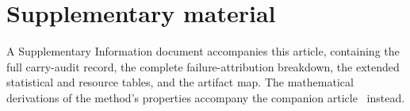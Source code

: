 \section*{Supplementary material}
A Supplementary Information document accompanies this article, containing
the full carry-audit record, the complete failure-attribution breakdown, the
extended statistical and resource tables, and the artifact map. The
mathematical derivations of the method's properties accompany the companion
article~\cite{methodpaper} instead.

